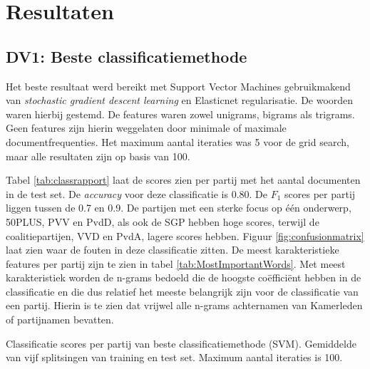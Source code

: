 
\section{Resultaten}

\subsection{DV1: Beste classificatiemethode}
Het beste resultaat werd bereikt met Support Vector Machines gebruikmakend van \textit{stochastic gradient descent learning} en Elasticnet regularisatie. De woorden waren hierbij gestemd. De features waren zowel unigrams, bigrams als trigrams. Geen features zijn hierin weggelaten door minimale of maximale documentfrequenties. Het maximum aantal iteraties was 5 voor de grid search, maar alle resultaten zijn op basis van 100.\par
Tabel \ref{tab:classrapport} laat de scores zien per partij met het aantal documenten in de test set. De \textit{accuracy} voor deze classificatie is 0.80. De $F_1$ scores per partij liggen tussen de 0.7 en 0.9. De partijen met een sterke focus op één onderwerp, 50PLUS, PVV en PvdD, als ook de SGP hebben hoge scores, terwijl de coalitiepartijen, VVD en PvdA, lagere scores hebben. Figuur \ref{fig:confusionmatrix} laat zien waar de fouten in deze classificatie zitten. De meest karakteristieke features per partij zijn te zien in tabel \ref{tab:MostImportantWords}. Met meest karakteristiek worden de n-grams bedoeld die de hoogste coëfficiënt hebben in de classificatie en die dus relatief het meeste belangrijk zijn voor de classificatie van een partij. Hierin is te zien dat vrijwel alle n-grams achternamen van Kamerleden of partijnamen bevatten.\par

\begin{table}[H]
\caption{Classificatie scores per partij van beste classificatiemethode (SVM). Gemiddelde van vijf splitsingen van training en test set. Maximum aantal iteraties is 100.}
\label{tab:classrapport}
\centering

\end{table}


